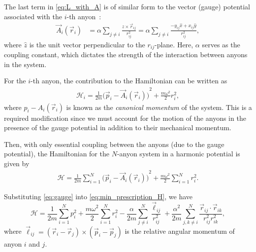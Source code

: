 
The last term in \cref{eq:L_with_A} is of similar form to the vector (gauge) potential associated with the $i$-th anyon~\cite{Khare2005,Date2003,Moriyasu1983}:
\begin{align}
    \vec{A}_i(\vec{r}_i) &= \alpha\sum_{j\neq i}\frac{\hat{z}\times \vec{r}_{ij}}{r_{ij}^2} = \alpha\sum_{j\neq i}\frac{-y_{ij}\hat{x} + x_{ij}\hat{y}}{r_{ij}^2}, \label{eq:gauge}
\end{align}
where $\hat{z}$ is the unit vector perpendicular to the $r_{ij}$-plane. Here, $\alpha$ serves as the coupling constant, which dictates the strength of the interaction between anyons in the system.


For the $i$-th anyon, the contribution to the Hamiltonian can be written as
\begin{align}
    \mathcal{H}_i = \frac{1}{2m}{\bigl(\vec{p}_i - \vec{A}_i(\vec{r}_i)\bigr)}^2 + \frac{m\omega^2}{2}{r}_i^{2},
\end{align}
where $p_i - A_i(\vec{r}_i)$ is known as the \textit{canonical momentum} of the system. This is a required modification since we must account for the motion of the anyons in the presence of the gauge potential in addition to their mechanical momentum.

Then, with only essential coupling between the anyons (due to the gauge potential), the Hamiltonian for the $N$-anyon system in a harmonic potential is given by
\begin{align}
    \mathcal{H} = \frac{1}{2m} \sum_{i=1}^{N}{\bigl(\vec{p}_i - \vec{A}_i(\vec{r}_i)\bigr)}^2 + \frac{m\omega^2}{2}\sum_{i=1}^{N}{r}_i^{2}. \label{eq:min_prescription_H}
\end{align}

Substituting \cref{eq:gauge} into \cref{eq:min_prescription_H}, we have
\begin{equation}
    \mathcal{H} = \frac{1}{2m}\sum_{i=1}^{N}{p}_i^{2} + \frac{m\omega^2}{2}\sum_{i=1}^{N}{r}_i^{2} - \frac{\alpha}{2m}\sum_{j\neq i}^{N}\frac{\vec{\ell}_{ij}}{r_{ij}^2} + \frac{\alpha^2}{2m}\sum_{j,k\neq i}^{N}\frac{\vec{r}_{ij}\cdot\vec{r}_{ik}}{r_{ij}^2r_{ik}^2},\label{eq:full_H}
\end{equation}
where $\vec{\ell}_{ij} = (\vec{r}_i-\vec{r}_j)\times(\vec{p}_i-\vec{p}_j)$ is the relative angular momentum of anyon $i$ and $j$.

